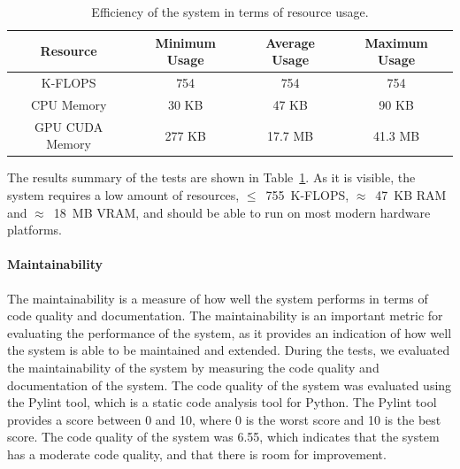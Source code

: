 \begin{table}[!htbp]
    \centering
    \begin{tabular}{|c||c|c|c|}
        \hline
        \textbf{Resource} & \textbf{Minimum Usage} & \textbf{Average Usage} & \textbf{Maximum Usage} \\
        \hline
        \hline
        K-FLOPS & 754 & 754 & 754\\
        \hline
        CPU Memory & 30 KB & 47 KB & 90 KB \\
        \hline
        GPU CUDA Memory & 277 KB & 17.7 MB  & 41.3 MB \\
        \hline
    \end{tabular}
    \caption{Efficiency of the system in terms of resource usage.}\label{tab:efficiency}
\end{table}
The results summary of the tests are shown in Table~\ref{tab:efficiency}.
As it is visible, the system requires a low amount of resources, $\le$~755~K-FLOPS, $\approx$~47~KB RAM and $\approx$~18~MB VRAM, and should be able to run on most modern hardware platforms.

\paragraph{Maintainability}
The maintainability is a measure of how well the system performs in terms of code quality and documentation.
The maintainability is an important metric for evaluating the performance of the system, as it provides an indication of how well the system is able to be maintained and extended.
During the tests, we evaluated the maintainability of the system by measuring the code quality and documentation of the system.
The code quality of the system was evaluated using the Pylint tool, which is a static code analysis tool for Python.
The Pylint tool provides a score between 0 and 10, where 0 is the worst score and 10 is the best score.
The code quality of the system was 6.55, which indicates that the system has a moderate code quality, and that there is room for improvement.

